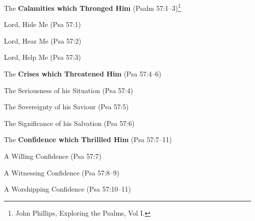 \begin{compactenum}[I.][3]
    \item The \textbf{Calamities which Thronged Him}  (Psalm 57:1--3)\footnote{John Phillips, Exploring the Psalms, Vol I.\cite{Phillips2001ExploringPsalms1}}
	\begin{compactenum}[A.][3]
		\item Lord, Hide Me  (Psa 57:1)
		\item Lord, Hear Me  (Psa 57:2)
		\item Lord, Help Me  (Psa 57:3)
	\end{compactenum}
    \item The \textbf{Crises which Threatened Him}  (Psa 57:4--6)
	\begin{compactenum}[A.][3]
		\item The Seriousness of his Situation  (Psa 57:4)
		\item The Sovereignty of his Saviour  (Psa 57:5)
		\item The Significance of his Salvation  (Psa 57:6)
	\end{compactenum}
    \item The \textbf{Confidence which Thrillled Him}  (Psa 57:7--11)
	\begin{compactenum}[A.][3]
		\item A Willing Confidence  (Psa 57:7)
		\item A Witnessing Confidence  (Psa 57:8--9)
		\item A Worshipping Confidence  (Psa 57:10--11)
	\end{compactenum}
\end{compactenum}